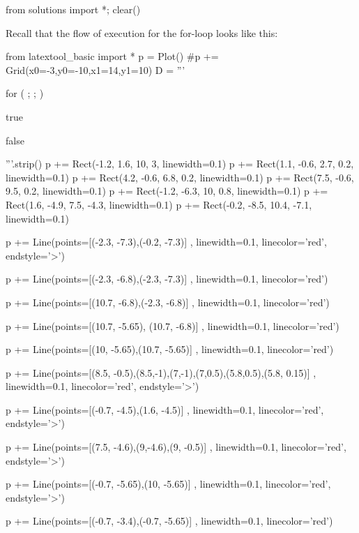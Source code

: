 \begin{python0}
from solutions import *; clear()
\end{python0}

Recall that the flow of execution for the for-loop looks like this:
\begin{python}
from latextool_basic import *
p = Plot()
#p += Grid(x0=-3,y0=-10,x1=14,y1=10)
D = '''





for (         ;                   ;              )








true

         

false





'''.strip()
p += Rect(-1.2, 1.6, 10, 3, linewidth=0.1)
p += Rect(1.1, -0.6, 2.7, 0.2, linewidth=0.1)
p += Rect(4.2, -0.6, 6.8, 0.2, linewidth=0.1)
p += Rect(7.5, -0.6, 9.5, 0.2, linewidth=0.1)
p += Rect(-1.2, -6.3, 10, 0.8, linewidth=0.1)
p += Rect(1.6, -4.9, 7.5, -4.3, linewidth=0.1)
p += Rect(-0.2, -8.5, 10.4, -7.1, linewidth=0.1)

p += Line(points=[(-2.3, -7.3),(-0.2, -7.3)] , linewidth=0.1, linecolor='red', endstyle='>')

p += Line(points=[(-2.3, -6.8),(-2.3, -7.3)] , linewidth=0.1, linecolor='red')

p += Line(points=[(10.7, -6.8),(-2.3, -6.8)] , linewidth=0.1, linecolor='red')

p += Line(points=[(10.7, -5.65), (10.7, -6.8)] , linewidth=0.1, linecolor='red')

p += Line(points=[(10, -5.65),(10.7, -5.65)] , linewidth=0.1, linecolor='red')

p += Line(points=[(8.5, -0.5),(8.5,-1),(7,-1),(7,0.5),(5.8,0.5),(5.8, 0.15)] , linewidth=0.1, linecolor='red', endstyle='>')

p += Line(points=[(-0.7, -4.5),(1.6, -4.5)] , linewidth=0.1, linecolor='red', endstyle='>')

p += Line(points=[(7.5, -4.6),(9,-4.6),(9, -0.5)] , linewidth=0.1, linecolor='red', endstyle='>')

p += Line(points=[(-0.7, -5.65),(10, -5.65)] , linewidth=0.1, linecolor='red', endstyle='>')

p += Line(points=[(-0.7, -3.4),(-0.7, -5.65)] , linewidth=0.1, linecolor='red')


\end{python}
